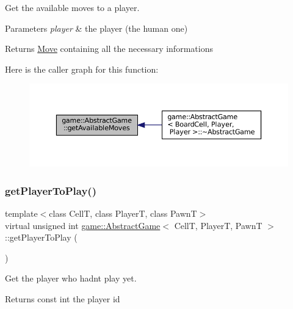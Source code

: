 Get the available moves to a player. 


\begin{DoxyParams}{Parameters}
{\em player} & the player (the human one) \\
\hline
\end{DoxyParams}
\begin{DoxyReturn}{Returns}
\hyperlink{structgame_1_1_move}{Move} containing all the necessary informations 
\end{DoxyReturn}
Here is the caller graph for this function\+:
\nopagebreak
\begin{figure}[H]
\begin{center}
\leavevmode
\includegraphics[width=350pt]{classgame_1_1_abstract_game_a01bbff0af90cc978203726bc7f914a7b_icgraph}
\end{center}
\end{figure}
\mbox{\label{classgame_1_1_abstract_game_a059d72564d4658be3c246d8865080d92}} 
\subsubsection{\texorpdfstring{get\+Player\+To\+Play()}{getPlayerToPlay()}}
{\footnotesize\ttfamily template$<$class CellT, class PlayerT, class PawnT$>$ \\
virtual unsigned int \hyperlink{classgame_1_1_abstract_game}{game\+::\+Abstract\+Game}$<$ CellT, PlayerT, PawnT $>$\+::get\+Player\+To\+Play (\begin{DoxyParamCaption}{ }\end{DoxyParamCaption})\hspace{0.3cm}{\ttfamily [pure virtual]}}



Get the player who hadn\textquotesingle{}t play yet. 

\begin{DoxyReturn}{Returns}
const int the player id 
\end{DoxyReturn}


